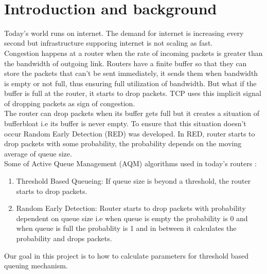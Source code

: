 \begin{center}
{\huge\textbf{\ttitle}}\\
\end{center}
\section{Introduction and background}
Today's world runs on internet. The demand for internet is increasing every second but infrastructure supporing internet is not scaling as fast. \\
Congestion happens at a router when the rate of incoming packets is greater than the bandwidth of outgoing link. Routers have a finite buffer so that they can store the packets that can't be sent immediately, it sends them when bandwidth is empty or not full, thus ensuring full utilization of bandwidth. But what if the buffer is full at the router, it starts to drop packets. TCP uses this implicit signal of dropping packets as sign of congestion. \\ 
The router can drop packets when its buffer gets full but it creates a situation of bufferbloat i.e its buffer is never empty. To ensure that this situation doesn't occur Random Early Detection (RED) was developed. In RED, router starts to drop packets with some probability, the probability depends on the moving average of queue size. \\
Some of Active Queue Management (AQM) algorithms used in today's routers :
\begin{enumerate}
    \item Threshold Based Queueing: If queue size is beyond a threshold, the router starts to drop packets. %
    \item Random Early Detection: Router starts to drop packets with probability dependent on queue size i.e when queue is empty the probability is 0 and when queue is full the probablity is 1 and in between it calculates the probability and drops packets.  %
\end{enumerate}
Our goal in this project is to how to calculate parameters for threshold based queuing mechanism.

\clearpage

